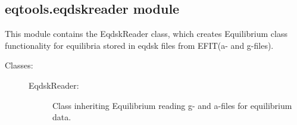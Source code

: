 \documentclass[letterpaper,10pt,english]{sphinxmanual}
\begin{document}
\subsection{eqtools.eqdskreader module}
\label{\detokenize{eqtools:module-eqtools.eqdskreader}}\label{\detokenize{eqtools:eqtools-eqdskreader-module}}
This module contains the EqdskReader class, which creates Equilibrium class
functionality for equilibria stored in eqdsk files from EFIT(a- and g-files).
\begin{description}
\item[{Classes:}] \leavevmode\begin{description}
\item[{EqdskReader:}] \leavevmode
Class inheriting Equilibrium reading g- and a-files for
equilibrium data.

\end{description}

\end{description}
\end{document}
